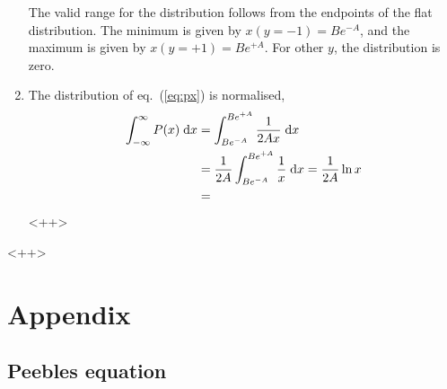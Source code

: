 \documentclass[a4paper,11pt]{article}
\newcommand{\diff}{\ensuremath{\; \text{d}}}
\begin{document}
\begin{enumerate}
        The valid range for the distribution follows from the endpoints of the flat distribution. The minimum is given by $x(y=-1) = Be^{-A}$, and the maximum is given by $x(y=+1) = Be^{+A}$. For other $y$, the distribution is zero.

    \item The distribution of eq.~(\ref{eq:px}) is normalised,
        \begin{align*}
            \int_{-\infty}^{\infty} P(x) \diff x &= \int_{Be^{-A}}^{Be^{+A}} \frac{1}{2Ax} \diff x \notag \\
            &=  \frac{1}{2A}\int_{Be^{-A}}^{Be^{+A}} \frac{1}{x} \diff x = \frac{1}{2A} \ln x \notag \\
            &= 
        \end{align*}<++>
\end{enumerate}<++>



%
%

\clearpage
\appendix
\section{Appendix}
\label{sec:appendix}

\subsection{Peebles equation}
\label{app:peebles}

%
\end{document}
